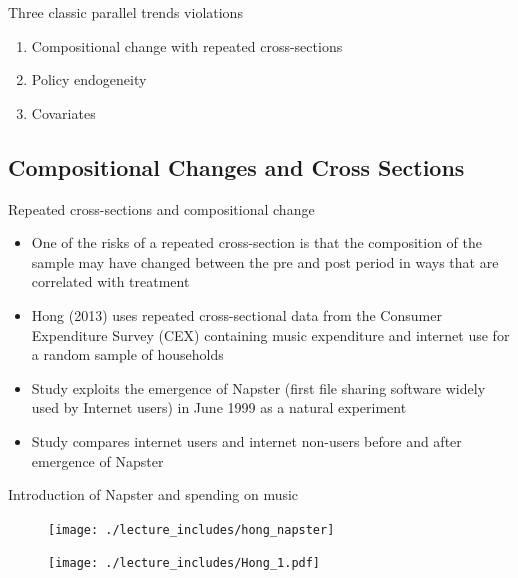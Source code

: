 \documentclass{beamer}
\begin{document}
\begin{frame}{Three classic parallel trends violations}

	\begin{enumerate}
	\item Compositional change with repeated cross-sections
	\item Policy endogeneity
	\item Covariates
	\end{enumerate}
\bigskip



\end{frame}

\subsection{Compositional Changes and Cross Sections}



\begin{frame}{Repeated cross-sections and compositional change}
	
	\begin{itemize}
	\item One of the risks of a repeated cross-section is that the composition of the sample may have changed between the pre and post period in ways that are correlated with treatment
	\item Hong (2013) uses repeated cross-sectional data from the Consumer Expenditure Survey (CEX) containing music expenditure and internet use for a random sample of households
	\item Study exploits the emergence of Napster (first file sharing software widely used by Internet users) in June 1999 as a natural experiment
	\item Study compares internet users and internet non-users before and after emergence of Napster
	\end{itemize}

\end{frame}

\begin{frame}{Introduction of Napster and spending on music}
	\begin{figure}
	\texttt{[image: ./lecture\_includes/hong\_napster]}
	\end{figure}
	
\end{frame}


\begin{frame}[plain]
	\begin{figure}
	\texttt{[image: ./lecture\_includes/Hong\_1.pdf]}
	\end{figure}
	
\end{frame}
\end{document}
